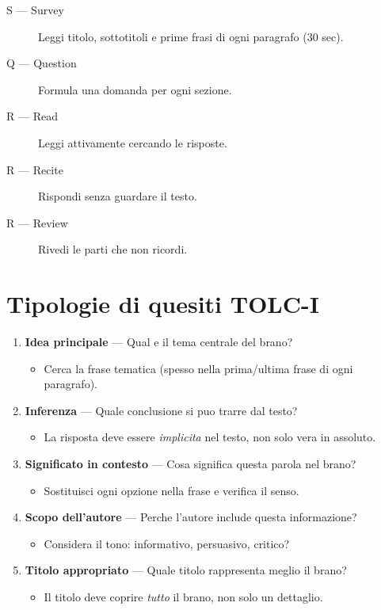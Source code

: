 \documentclass[12pt, a4paper, twoside, openright]{book}
\theoremstyle{definition}
\begin{document}
\begin{defbox}[Metodo SQ3R]
\begin{description}
  \item[S --- Survey] Leggi titolo, sottotitoli e prime frasi di ogni paragrafo (30 sec).
  \item[Q --- Question] Formula una domanda per ogni sezione.
  \item[R --- Read] Leggi attivamente cercando le risposte.
  \item[R --- Recite] Rispondi senza guardare il testo.
  \item[R --- Review] Rivedi le parti che non ricordi.
\end{description}
\end{defbox}

\section{Tipologie di quesiti TOLC-I}

\begin{enumerate}[leftmargin=2em]
  \item \textbf{Idea principale} --- Qual e il tema centrale del brano?
        \begin{itemize}
          \item Cerca la frase tematica (spesso nella prima/ultima frase di ogni paragrafo).
        \end{itemize}

  \item \textbf{Inferenza} --- Quale conclusione si puo trarre dal testo?
        \begin{itemize}
          \item La risposta deve essere \emph{implicita} nel testo, non solo vera in assoluto.
        \end{itemize}

  \item \textbf{Significato in contesto} --- Cosa significa questa parola nel brano?
        \begin{itemize}
          \item Sostituisci ogni opzione nella frase e verifica il senso.
        \end{itemize}

  \item \textbf{Scopo dell'autore} --- Perche l'autore include questa informazione?
        \begin{itemize}
          \item Considera il tono: informativo, persuasivo, critico?
        \end{itemize}

  \item \textbf{Titolo appropriato} --- Quale titolo rappresenta meglio il brano?
        \begin{itemize}
          \item Il titolo deve coprire \emph{tutto} il brano, non solo un dettaglio.
        \end{itemize}
\end{enumerate}
\end{document}
